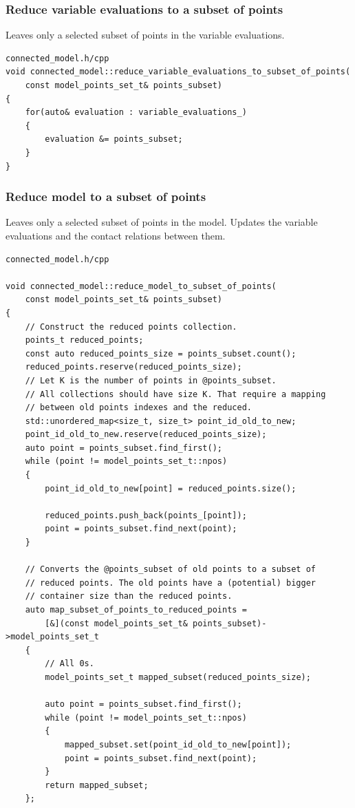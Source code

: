 \documentclass{article}
\begin{document}
	\subsubsection*{Reduce variable evaluations to a subset of points}
	Leaves only a selected subset of points in the variable evaluations.
\\
\begin{lstlisting}
connected_model.h/cpp
void connected_model::reduce_variable_evaluations_to_subset_of_points(
	const model_points_set_t& points_subset)
{
    for(auto& evaluation : variable_evaluations_)
    {
        evaluation &= points_subset;
    }
}
\end{lstlisting}

	\newpage
	\subsubsection*{Reduce model to a subset of points}
	Leaves only a selected subset of points in the model. Updates the variable evaluations and the contact relations between them.
\\
\begin{lstlisting}
connected_model.h/cpp

void connected_model::reduce_model_to_subset_of_points(
	const model_points_set_t& points_subset)
{
    // Construct the reduced points collection.
    points_t reduced_points;
    const auto reduced_points_size = points_subset.count();
    reduced_points.reserve(reduced_points_size);
    // Let K is the number of points in @points_subset.
    // All collections should have size K. That require a mapping
    // between old points indexes and the reduced.
    std::unordered_map<size_t, size_t> point_id_old_to_new;
    point_id_old_to_new.reserve(reduced_points_size);
    auto point = points_subset.find_first();
    while (point != model_points_set_t::npos)
    {
        point_id_old_to_new[point] = reduced_points.size();

        reduced_points.push_back(points_[point]);
        point = points_subset.find_next(point);
    }

    // Converts the @points_subset of old points to a subset of
    // reduced points. The old points have a (potential) bigger
    // container size than the reduced points.
    auto map_subset_of_points_to_reduced_points =
        [&](const model_points_set_t& points_subset)->model_points_set_t
    {
        // All 0s.
        model_points_set_t mapped_subset(reduced_points_size);

        auto point = points_subset.find_first();
        while (point != model_points_set_t::npos)
        {
            mapped_subset.set(point_id_old_to_new[point]);
            point = points_subset.find_next(point);
        }
        return mapped_subset;
    };
\end{lstlisting}
\end{document}
